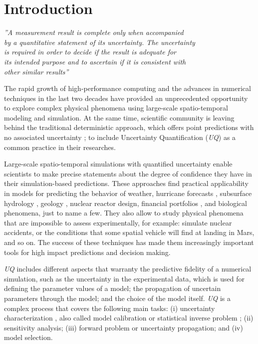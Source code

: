 \chapter[Introduction]{Introduction}\label{cap:intro}

\begin{flushright}
	\textit{''A measurement result is complete only when accompanied \\ 
	by a quantitative statement of its uncertainty. The uncertainty \\
	is required in order to decide if the result is adequate for \\
	its intended purpose and to ascertain if it is consistent with \\
	other similar results'' \\}
\end{flushright}


The rapid growth of high-performance computing and the advances in numerical techniques in the last two decades have provided an unprecedented opportunity to explore complex physical phenomena using large-scale spatio-temporal modeling and simulation.  At the same time, scientific community is leaving behind the traditional deterministic approach, which offers  point predictions with no associated uncertainty \cite{Johnstone2015};  to include Uncertainty Quantification (\textit{UQ}) as a common practice in their researches. 

Large-scale spatio-temporal simulations with quantified uncertainty enable scientists to make precise statements about the degree of confidence they have in their simulation-based predictions. These approaches find practical applicability in models for predicting the behavior of weather, hurricane forecasts \cite{Tobergte2013}, subsurface hydrology \cite{Baroni2014a}, geology \cite{Guerra2016}, nuclear reactor design, financial portfolios \cite{Chen2008}, and biological phenomena, just to name a few. They also allow to study physical phenomena that are impossible to assess experimentally, for example: simulate nuclear accidents, or the conditions that some spatial vehicle will find at landing in Mars, and so on. The success of these techniques has made them increasingly important tools for high impact predictions and decision making.

\textit{UQ}  includes different aspects that warranty the predictive fidelity of a numerical simulation, such as the uncertainty in the experimental data, which is used for defining the parameter values of a model; the propagation of uncertain  parameters through the model; and the choice of the model itself. \textit{UQ} is a complex process that covers the following main tasks: (i) uncertainty characterization \cite{Crespo2014}, also called model calibration \cite{Farrell2015a} or statistical inverse problem \cite{Estacio-Hiroms2012};  (ii) sensitivity analysis; (iii) forward problem or uncertainty propagation; and (iv) model selection.


